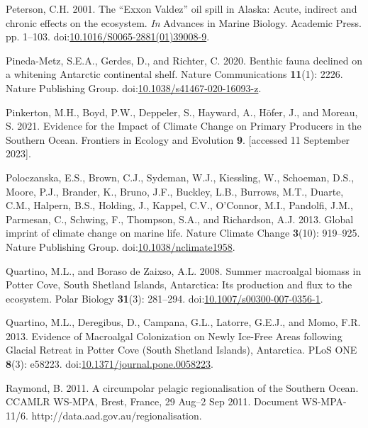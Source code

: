 \documentclass[
]{article}
\newlength{\cslhangindent}
\newenvironment{CSLReferences}[2] %
 {\begin{list}{}{%
  \setlength{\itemindent}{0pt}
  \setlength{\leftmargin}{0pt}
  \setlength{\parsep}{0pt}
  \ifodd #1
   \setlength{\leftmargin}{\cslhangindent}
   \setlength{\itemindent}{-1\cslhangindent}
  \fi
  \setlength{\itemsep}{#2\baselineskip}}}
 {\end{list}}
\begin{document}
\begin{CSLReferences}{1}{0}
Peterson, C.H. 2001. The {``{Exxon Valdez}''} oil spill in {Alaska}:
{Acute}, indirect and chronic effects on the ecosystem. \emph{In}
Advances in {Marine Biology}. Academic Press. pp. 1--103.
doi:\href{https://doi.org/10.1016/S0065-2881(01)39008-9}{10.1016/S0065-2881(01)39008-9}.

Pineda-Metz, S.E.A., Gerdes, D., and Richter, C. 2020. Benthic fauna
declined on a whitening {Antarctic} continental shelf. Nature
Communications \textbf{11}(1): 2226. Nature Publishing Group.
doi:\href{https://doi.org/10.1038/s41467-020-16093-z}{10.1038/s41467-020-16093-z}.

Pinkerton, M.H., Boyd, P.W., Deppeler, S., Hayward, A., Höfer, J., and
Moreau, S. 2021. Evidence for the {Impact} of {Climate Change} on
{Primary Producers} in the {Southern Ocean}. Frontiers in Ecology and
Evolution \textbf{9}. {[}accessed 11 September 2023{]}.

Poloczanska, E.S., Brown, C.J., Sydeman, W.J., Kiessling, W., Schoeman,
D.S., Moore, P.J., Brander, K., Bruno, J.F., Buckley, L.B., Burrows,
M.T., Duarte, C.M., Halpern, B.S., Holding, J., Kappel, C.V., O'Connor,
M.I., Pandolfi, J.M., Parmesan, C., Schwing, F., Thompson, S.A., and
Richardson, A.J. 2013. Global imprint of climate change on marine life.
Nature Climate Change \textbf{3}(10): 919--925. Nature Publishing Group.
doi:\href{https://doi.org/10.1038/nclimate1958}{10.1038/nclimate1958}.

Quartino, M.L., and Boraso de Zaixso, A.L. 2008. Summer macroalgal
biomass in {Potter Cove}, {South Shetland Islands}, {Antarctica}: Its
production and flux to the ecosystem. Polar Biology \textbf{31}(3):
281--294.
doi:\href{https://doi.org/10.1007/s00300-007-0356-1}{10.1007/s00300-007-0356-1}.

Quartino, M.L., Deregibus, D., Campana, G.L., Latorre, G.E.J., and Momo,
F.R. 2013. Evidence of {Macroalgal Colonization} on {Newly Ice-Free
Areas} following {Glacial Retreat} in {Potter Cove} ({South Shetland
Islands}), {Antarctica}. PLoS ONE \textbf{8}(3): e58223.
doi:\href{https://doi.org/10.1371/journal.pone.0058223}{10.1371/journal.pone.0058223}.

Raymond, B. 2011. A circumpolar pelagic regionalisation of the {Southern
Ocean}. {CCAMLR WS-MPA}, {Brest}, {France}, 29 {Aug}--2 {Sep} 2011.
{Document WS-MPA-11}/6. {http://data.aad.gov.au/regionalisation}.


\end{CSLReferences}
\end{document}
